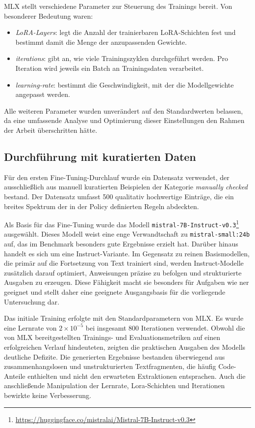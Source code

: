 MLX stellt verschiedene Parameter zur Steuerung des Trainings bereit.
Von besonderer Bedeutung waren:

\begin{itemize}
    \item \textit{LoRA-Layers}: legt die Anzahl der trainierbaren LoRA-Schichten fest und bestimmt damit die Menge der anzupassenden Gewichte.
    \item \textit{iterations}: gibt an, wie viele Trainingszyklen durchgeführt werden. Pro Iteration wird jeweils ein Batch an Trainingsdaten verarbeitet.
    \item \textit{learning-rate}: bestimmt die Geschwindigkeit, mit der die Modellgewichte angepasst werden.
\end{itemize}

Alle weiteren Parameter wurden unverändert auf den Standardwerten belassen, da eine umfassende Analyse und Optimierung dieser Einstellungen den Rahmen der Arbeit überschritten hätte.

\subsection{Durchführung mit kuratierten Daten}

Für den ersten Fine-Tuning-Durchlauf wurde ein Datensatz verwendet, der ausschließlich aus manuell kuratierten Beispielen der Kategorie \textit{manually checked} bestand.
Der Datensatz umfasst \num{500} qualitativ hochwertige Einträge, die ein breites Spektrum der in der Policy definierten Regeln abdeckten.

Als Basis für das Fine-Tuning wurde das Modell \texttt{mistral-7B-Instruct-v0.3}\footnote{\url{https://huggingface.co/mistralai/Mistral-7B-Instruct-v0.3}} ausgewählt.
Dieses Modell weist eine enge Verwandtschaft zu \texttt{mistral-small:24b} auf, das im Benchmark besonders gute Ergebnisse erzielt hat.
Darüber hinaus handelt es sich um eine Instruct-Variante.
Im Gegensatz zu reinen Basismodellen, die primär auf die Fortsetzung von Text trainiert sind, werden Instruct-Modelle zusätzlich darauf optimiert, Anweisungen präzise zu befolgen und strukturierte Ausgaben zu erzeugen.
Diese Fähigkeit macht sie besonders für Aufgaben wie \gls{ner} geeignet und stellt daher eine geeignete Ausgangsbasis für die vorliegende Untersuchung dar.

Das initiale Training erfolgte mit den Standardparametern von MLX.
Es wurde eine Lernrate von $2 \times 10^{-5}$ bei insgesamt \num{800} Iterationen verwendet.
Obwohl die von MLX bereitgestellten Trainings- und Evaluationsmetriken auf einen erfolgreichen Verlauf hindeuteten, zeigten die praktischen Ausgaben des Modells deutliche Defizite.
Die generierten Ergebnisse bestanden überwiegend aus zusammenhangslosen und unstrukturierten Textfragmenten, die häufig Code-Anteile enthielten und nicht den erwarteten Extraktionen entsprachen.
Auch die anschließende Manipulation der Lernrate, Lora-Schichten und Iterationen bewirkte keine Verbesserung.

